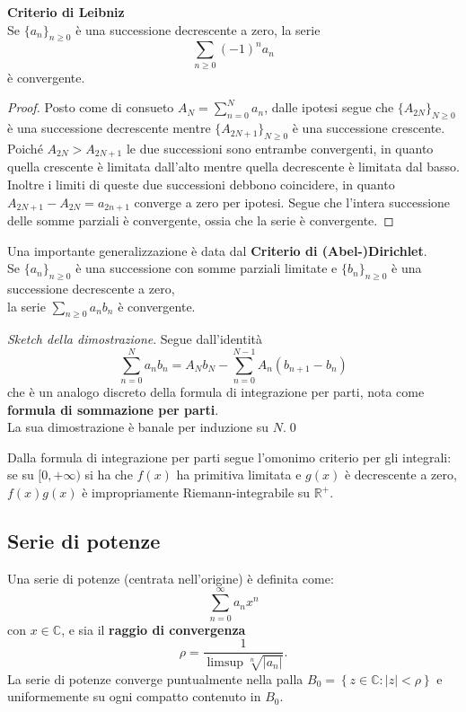 \documentclass[a4paper,twoside]{article}
\newcommand{\C}{\mathbb{C}}
\newcommand{\R}{\mathbb{R}}
\theoremstyle{definition}
\numberwithin{theorem}{section}
\begin{document}
\textbf{Criterio di Leibniz}\\
Se $\{a_n\}_{n\geq 0}$ è una successione decrescente a zero, la serie
$$ \sum_{n\geq 0} (-1)^n a_n $$
è convergente.\\
\begin{proof} Posto come di consueto $A_N=\sum_{n=0}^{N}a_n$, dalle ipotesi segue che $\{A_{2N}\}_{N\geq 0}$ è una successione decrescente mentre $\{A_{2N+1}\}_{N\geq 0}$ è una successione crescente. Poiché $A_{2N} > A_{2N+1}$ le due successioni sono entrambe convergenti, in quanto quella crescente è limitata dall'alto mentre quella decrescente è limitata dal basso. Inoltre i limiti di queste due successioni debbono coincidere, in quanto $A_{2N+1}-A_{2N}=a_{2n+1}$ converge a zero per ipotesi. Segue che l'intera successione delle somme parziali è convergente, ossia che la serie è convergente. 
\end{proof}


Una importante generalizzazione è data dal \textbf{Criterio di (Abel-)Dirichlet}.\\
Se $\{a_n\}_{n\geq 0}$ è una successione con somme parziali limitate e $\{b_n\}_{n\geq 0}$ è una successione decrescente a zero,\\ la serie $\sum_{n\geq 0}a_n b_n$ è convergente.

\emph{Sketch della dimostrazione}. Segue dall'identità
$$ \sum_{n=0}^{N}a_n b_n = A_N b_N - \sum_{n=0}^{N-1} A_n (b_{n+1}-b_n) $$
che è un analogo discreto della formula di integrazione per parti, nota come \textbf{formula di sommazione per parti}.\\ La sua dimostrazione è banale per induzione su $N$.\qed

Dalla formula di integrazione per parti segue l'omonimo criterio per gli integrali: se su $[0,+\infty)$ si ha che $f(x)$ ha primitiva limitata e $g(x)$ è decrescente a zero, $f(x)g(x)$ è impropriamente Riemann-integrabile su $\R^+$.

\subsection{Serie di potenze}
Una serie di potenze (centrata nell'origine) è definita come:
$$\sum_{n=0}^{\infty}a_n x^n$$
con $x\in\C$, e sia il \textbf{raggio di convergenza} \\
$$\rho=\frac{1}{\limsup\sqrt[n]{|a_n|}}.$$
La serie di potenze converge puntualmente nella palla $B_0=\left\{z\in\C : |z|< \rho \right\}$ e uniformemente su ogni compatto contenuto in $B_0$.
\end{document}
